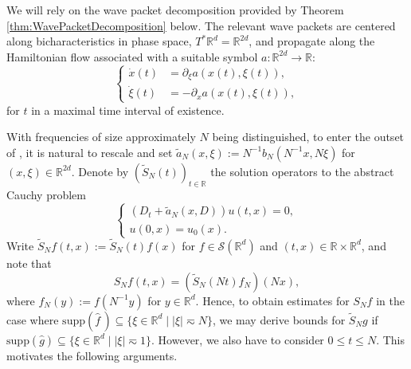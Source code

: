 \documentclass{amsart}
\numberwithin{equation}{section}
\theoremstyle{definition}
\newcommand{\R}{\mathbb{R}}
\newcommand{\Rd}{\mathbb{R}^{d}}
\newcommand {\Sw}{\mathcal{S}}
\newcommand {\supp}{\mathrm{supp}}
\newcommand {\wh}{\widehat}
\begin{document}
We will rely on the wave packet decomposition provided by Theorem \ref{thm:WavePacketDecomposition} below. The  relevant 
wave packets are centered along bicharacteristics in phase space, $T^{*}\Rd=\R^{2d}$, and propagate along the Hamiltonian flow associated with a suitable symbol $a:\R^{2d}\to \R$:
\begin{equation}\label{eq:flow}
    \begin{cases}
        \dot{x}(t)\!&= \partial_{\xi} a(x(t),\xi(t)),  \\
        \dot{\xi}(t)\!&= - \partial_x a(x(t),\xi(t)),
    \end{cases}
\end{equation} 
for $t$ in a maximal time interval of existence. 

With frequencies of size approximately $N$ being distinguished, to enter the outset of \cite{SchippaTataru2025}, it is natural to rescale and set $\tilde{a}_N(x,\xi) := N^{-1} b_N(N^{-1} x, N \xi)$ for $(x,\xi)\in\R^{2d}$. 
Denote by $(\tilde{S}_{N}(t))_{t\in\R}$ the solution operators to the abstract Cauchy problem
\begin{equation}\label{eq:halfwaveatilde}
        \begin{cases}%
           (D_t+ \tilde{a}_N(x,D))u(t,x)= 0,\\
            u(0,x) = u_{0}(x).%
        \end{cases}%
    \end{equation}
Write $\tilde{S}_{N}f(t,x):=\tilde{S}_{N}(t)f(x)$ for $f\in\Sw(\Rd)$ and $(t,x)\in\R\times \Rd$, and note that
\begin{equation}\label{eq:rescalingkey}
S_{N}f(t,x)=(\tilde{S}_{N}(Nt)f_{N})(Nx),
\end{equation}
where $f_{N}(y):=f(N^{-1}y)$ for $y\in\Rd$. Hence, to obtain estimates for $S_{N}f$ in the case where $\supp(\wh{f}\,)\subseteq\{\xi\in\Rd\mid |\xi|\eqsim N\}$, we may derive bounds for $\tilde{S}_{N}g$ if $\supp(\wh{g})\subseteq\{\xi\in\Rd\mid |\xi|\eqsim 1\}$. However, we also have to consider $0\leq t \leq N$. This motivates the following arguments.
\end{document}
